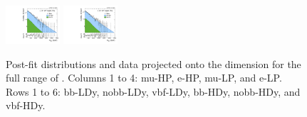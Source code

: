 \begin{figure}[htbp]
  \includegraphics[width=0.18\textwidth]{fig/analysisAppendix/PostFit_SR_MVV__mu_LP_vbf_HDy_Run2.pdf}
  \includegraphics[width=0.18\textwidth]{fig/analysisAppendix/PostFit_SR_MVV__e_LP_vbf_HDy_Run2.pdf}\\
  \caption{
    Post-fit distributions and data projected onto the \MVV dimension for the full range of \MJ.
    Columns 1 to 4: mu-HP, e-HP, mu-LP, and e-LP.
    Rows 1 to 6: bb-LDy, nobb-LDy, vbf-LDy, bb-HDy, nobb-HDy, and vbf-HDy.
  }
  \label{fig:postfit_MVV_Run2}
\end{figure}

